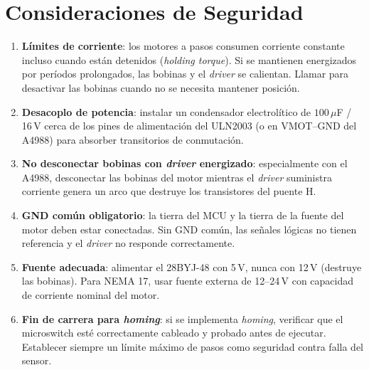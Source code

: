 \documentclass[11pt]{article}
\begin{document}
\section{Consideraciones de Seguridad}
\begin{enumerate}
  \item \textbf{Límites de corriente}: los motores a pasos consumen corriente constante
        incluso cuando están detenidos (\emph{holding torque}). Si se mantienen
        energizados por períodos prolongados, las bobinas y el \emph{driver} se
        calientan. Llamar  para desactivar las bobinas cuando no se
        necesita mantener posición.
  \item \textbf{Desacoplo de potencia}: instalar un condensador electrolítico de
        $100\,\mu$F / 16\,V cerca de los pines de alimentación del ULN2003 (o en
        VMOT--GND del A4988) para absorber transitorios de conmutación.
  \item \textbf{No desconectar bobinas con \emph{driver} energizado}: especialmente con
        el A4988, desconectar las bobinas del motor mientras el \emph{driver} suministra
        corriente genera un arco que destruye los transistores del puente H.
  \item \textbf{GND común obligatorio}: la tierra del MCU y la tierra de la fuente del
        motor deben estar conectadas. Sin GND común, las señales lógicas no tienen
        referencia y el \emph{driver} no responde correctamente.
  \item \textbf{Fuente adecuada}: alimentar el 28BYJ-48 con 5\,V, nunca con 12\,V
        (destruye las bobinas). Para NEMA 17, usar fuente externa de 12--24\,V con
        capacidad de corriente nominal del motor.
  \item \textbf{Fin de carrera para \emph{homing}}: si se implementa \emph{homing},
        verificar que el microswitch esté correctamente cableado y probado antes de
        ejecutar. Establecer siempre un límite máximo de pasos como seguridad contra
        falla del sensor.
\end{enumerate}

\end{document}
